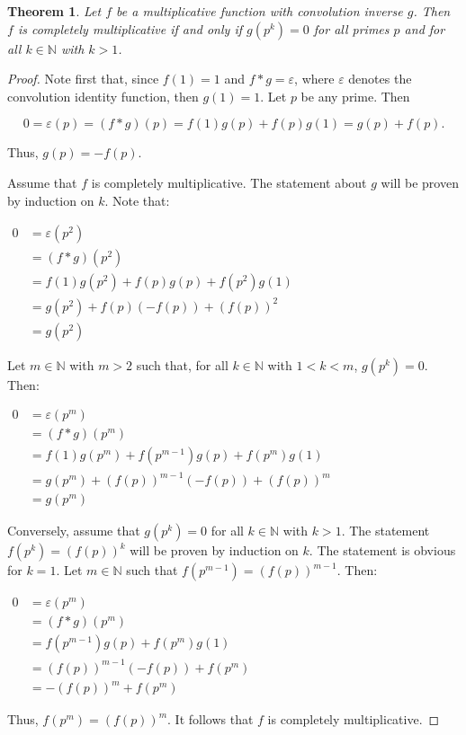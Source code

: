 \documentclass[12pt]{article}
\newtheorem*{thm*}{Theorem}
\begin{document}
\begin{thm*}
Let $f$ be a multiplicative function with convolution inverse $g$.  Then $f$ is completely multiplicative if and only if $g(p^k)=0$ for all primes $p$ and for all $k \in \mathbb{N}$ with $k>1$.
\end{thm*}

\begin{proof}
Note first that, since $f(1)=1$ and $f*g=\varepsilon$, where $\varepsilon$ denotes the convolution identity function, then $g(1)=1$.  Let $p$ be any prime.  Then

$$0=\varepsilon(p)=(f*g)(p)=f(1)g(p)+f(p)g(1)=g(p)+f(p).$$

Thus, $g(p)=-f(p)$.

Assume that $f$ is completely multiplicative.  The statement about $g$ will be proven by induction on $k$.  Note that:

\begin{center}
$\begin{array}{ll}
0 & =\varepsilon(p^2) \\
& =(f*g)(p^2) \\
& =f(1)g(p^2)+f(p)g(p)+f(p^2)g(1) \\
& =g(p^2)+f(p)(-f(p))+(f(p))^2 \\
& =g(p^2) \end{array}$
\end{center}

Let $m \in \mathbb{N}$ with $m>2$ such that, for all $k \in \mathbb{N}$ with $1<k<m$, $g(p^k)=0$.  Then:

\begin{center}
$\begin{array}{ll}
0 & =\varepsilon(p^m) \\
& =(f*g)(p^m) \\
& =f(1)g(p^m)+f(p^{m-1})g(p)+f(p^m)g(1) \\
& =g(p^m)+(f(p))^{m-1}(-f(p))+(f(p))^m \\
& =g(p^m) \end{array}$
\end{center}

Conversely, assume that $g(p^k)=0$ for all $k \in \mathbb{N}$ with $k>1$.  The statement $f(p^k)=(f(p))^k$ will be proven by induction on $k$.  The statement is obvious for $k=1$.  Let $m \in \mathbb{N}$ such that $f(p^{m-1})=(f(p))^{m-1}$.  Then:

\begin{center}
$\begin{array}{ll}
0 & =\varepsilon(p^m) \\
& =(f*g)(p^m) \\
& =f(p^{m-1})g(p)+f(p^m)g(1) \\
& =(f(p))^{m-1}(-f(p))+f(p^m) \\
& =-(f(p))^m+f(p^m) \end{array}$
\end{center}

Thus, $f(p^m)=(f(p))^m$.  It follows that $f$ is completely multiplicative.
\end{proof}
\end{document}
